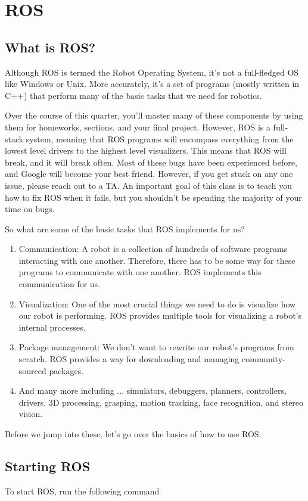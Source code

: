 \section{ROS}
\subsection{What is ROS?}
Although ROS is termed the Robot Operating System, it's not a full-fledged OS like Windows or Unix. More accurately, it's a set of programs (mostly written in C++) that perform many of the basic tasks that we need for robotics. 

Over the course of this quarter, you'll master many of these components by using them for homeworks, sections, and your final project. However, ROS is a full-stack system, meaning that ROS programs will encompass everything from the lowest level drivers to the highest level visualizers. This means that ROS will break, and it will break often. Most of these bugs have been experienced before, and Google will become your best friend. However, if you get stuck on any one issue, please reach out to a TA. An important goal of this class is to teach you how to fix ROS when it fails, but you shouldn't be spending the majority of your time on bugs. 

So what are some of the basic tasks that ROS implements for us?
\begin{enumerate}
\item Communication: A robot is a collection of hundreds of software programs interacting with one another. Therefore, there has to be some way for these programs to communicate with one another. ROS implements this communication for us.
\item Visualization: One of the most crucial things we need to do is visualize how our robot is performing. ROS provides multiple tools for visualizing a robot's internal processes.
\item Package management: We don't want to rewrite our robot's programs from scratch. ROS provides a way for downloading and managing community-sourced packages.
\item And many more including ... simulators, debuggers, planners, controllers, drivers, 3D processing, grasping, motion tracking, face recognition, and stereo vision.
\end{enumerate}

Before we jump into these, let's go over the basics of how to use ROS.
\subsection{Starting ROS}
To start ROS, run the following command 

